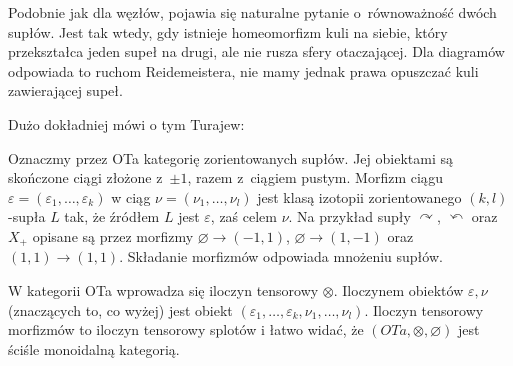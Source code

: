 Podobnie jak dla węzłów, pojawia się naturalne pytanie o~równoważność dwóch supłów.
Jest tak wtedy, gdy istnieje homeomorfizm kuli na siebie, który przekształca jeden supeł na drugi, ale nie rusza sfery otaczającej.
Dla diagramów odpowiada to ruchom Reidemeistera, nie mamy jednak prawa opuszczać kuli zawierającej supeł.

Dużo dokładniej mówi o tym Turajew:
%

\begin{proposition}
    Oznaczmy przez OTa kategorię zorientowanych supłów.
    Jej obiektami są skończone ciągi złożone z~$\pm 1$, razem z~ciągiem pustym.
    Morfizm ciągu $\varepsilon = (\varepsilon_1, \ldots, \varepsilon_k)$ w ciąg $\nu = (\nu_1, \ldots, \nu_l)$ jest klasą izotopii zorientowanego $(k, l)$-supła $L$ tak, że źródłem $L$ jest $\varepsilon$, zaś celem $\nu$.
    Na przykład supły $\curvearrowright$, $\curvearrowleft$ oraz $X_+$ opisane są przez morfizmy $\varnothing \to (-1, 1)$, $\varnothing \to (1, -1)$ oraz $(1, 1) \to (1, 1)$.
    Składanie morfizmów odpowiada mnożeniu supłów.

    W kategorii OTa wprowadza się iloczyn tensorowy $\otimes$. Iloczynem obiektów $\varepsilon, \nu$ (znaczących to, co wyżej) jest obiekt $(\varepsilon_1, \ldots, \varepsilon_k, \nu_1, \ldots, \nu_l)$.
    Iloczyn tensorowy morfizmów to iloczyn tensorowy splotów i łatwo widać, że $(OTa, \otimes, \varnothing)$ jest ściśle monoidalną kategorią.


\end{proposition}
